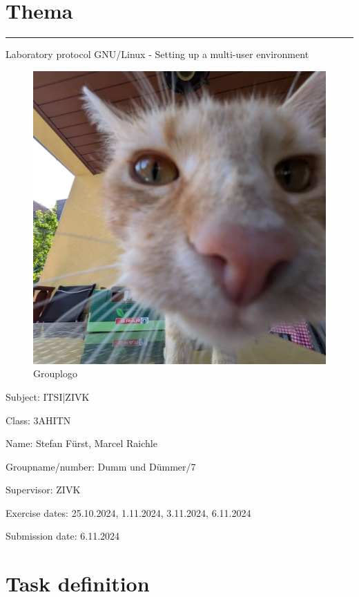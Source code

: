 \documentclass[a4paper]{article}
\begin{document}

\pagestyle{oida}
\section*{Thema}
\par\noindent\rule{\textwidth}{0.4pt}

Laboratory protocol
GNU/Linux - Setting up a multi-user environment

\begin{figure}[h]
	\includegraphics[scale=0.3]{images/mika.jpeg}
	\caption{Grouplogo}
\end{figure}

\vspace*{\fill}
Subject:	ITSI|ZIVK

Class:	3AHITN

Name:	Stefan Fürst, Marcel Raichle

Groupname/number: Dumm und Dümmer/7

Supervisor: 	ZIVK

Exercise dates:	25.10.2024, 1.11.2024, 3.11.2024, 6.11.2024

Submission date: 6.11.2024


\newpage
\tableofcontents

\newpage

\section{Task definition}
\end{document}
